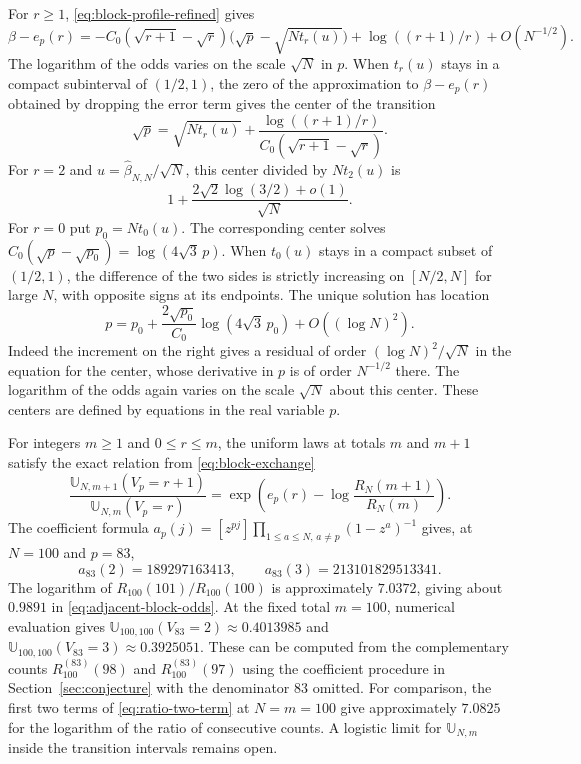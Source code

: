\documentclass[11pt]{amsart}
\theoremstyle{remark}
\begin{document}
For \(r\ge1\), \eqref{eq:block-profile-refined} gives
\begin{equation}\label{eq:logistic-exponent}
 \beta-e_p(r)=-C_0(\sqrt{r+1}-\sqrt r)
   \bigl(\sqrt p-\sqrt{Nt_r(u)}\bigr)
     +\log((r+1)/r)+O(N^{-1/2}).
\end{equation}
The logarithm of the odds varies on the scale \(\sqrt N\) in \(p\).
When \(t_r(u)\) stays in a compact subinterval of \((1/2,1)\), the
zero of the approximation to \(\beta-e_p(r)\) obtained by dropping
the error term gives the center of the transition
\[
 \sqrt p=\sqrt{Nt_r(u)}
         +\frac{\log((r+1)/r)}{C_0(\sqrt{r+1}-\sqrt r)}.
\]
For \(r=2\) and \(u=\widehat\beta_{N,N}/\sqrt N\), this center divided by
\(Nt_2(u)\) is
\[
 1+\frac{2\sqrt2\log(3/2)+o(1)}{\sqrt N}.
\]
For \(r=0\) put \(p_0=Nt_0(u)\). The corresponding center solves
\(C_0(\sqrt p-\sqrt{p_0})=\log(4\sqrt3\,p)\). When \(t_0(u)\) stays in a
compact subset of \((1/2,1)\), the difference of the two sides is
strictly increasing on \([N/2,N]\) for large \(N\), with opposite signs
at its endpoints. The unique solution has location
\[
 p=p_0+\frac{2\sqrt{p_0}}{C_0}\log(4\sqrt3\,p_0)+O((\log N)^2).
\]
Indeed the increment on the right gives a residual of order
\((\log N)^2/\sqrt N\) in the equation for the center, whose derivative in
\(p\) is of order \(N^{-1/2}\) there. The logarithm of the odds again
varies on the scale \(\sqrt N\) about this center. These centers are
defined by equations in the real variable \(p\).

For integers \(m\ge1\) and \(0\le r\le m\), the uniform laws at totals
\(m\) and \(m+1\) satisfy the exact relation from \eqref{eq:block-exchange}
\begin{equation}\label{eq:adjacent-block-odds}
 \frac{\mathbb U_{N,m+1}(V_p=r+1)}
      {\mathbb U_{N,m}(V_p=r)}
 =\exp\!\left(e_p(r)-\log\frac{R_N(m+1)}{R_N(m)}\right).
\end{equation}
The coefficient formula \(a_p(j)=[z^{pj}]\prod_{1\le a\le N,\,a\ne p}(1-z^a)^{-1}\)
gives, at \(N=100\) and \(p=83\),
\[
 a_{83}(2)=189297163413,\qquad a_{83}(3)=213101829513341.
\]
The logarithm of \(R_{100}(101)/R_{100}(100)\) is approximately
\(7.0372\), giving about \(0.9891\) in \eqref{eq:adjacent-block-odds}. At the fixed total
\(m=100\), numerical evaluation gives
\(\mathbb U_{100,100}(V_{83}=2)\approx0.4013985\) and
\(\mathbb U_{100,100}(V_{83}=3)\approx0.3925051\). These can be computed
from the complementary counts \(R_{100}^{(83)}(98)\) and \(R_{100}^{(83)}(97)\)
using the coefficient procedure in Section~\ref{sec:conjecture} with the
denominator \(83\) omitted. For comparison, the first two terms of
\eqref{eq:ratio-two-term} at \(N=m=100\) give approximately \(7.0825\)
for the logarithm of the ratio of consecutive counts. A logistic limit for \(\mathbb U_{N,m}\) inside
the transition intervals remains open.
\end{document}
